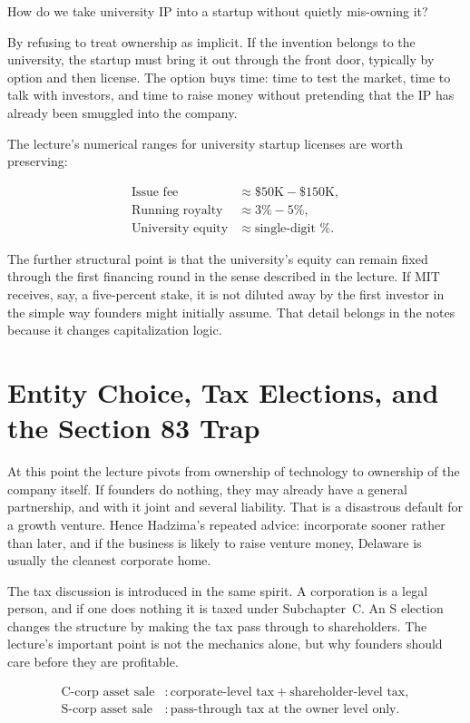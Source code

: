How do we take university IP into a startup without quietly mis-owning it?

By refusing to treat ownership as implicit. If the invention belongs to the university, the startup must bring it out through the front door, typically by option and then license. The option buys time: time to test the market, time to talk with investors, and time to raise money without pretending that the IP has already been smuggled into the company.

The lecture's numerical ranges for university startup licenses are worth preserving:

\begin{align}
\text{Issue fee} &\approx \$50\text{K}-\$150\text{K},\\
\text{Running royalty} &\approx 3\%-5\%,\\
\text{University equity} &\approx \text{single-digit }\%.
\end{align}

The further structural point is that the university's equity can remain fixed through the first financing round in the sense described in the lecture. If MIT receives, say, a five-percent stake, it is not diluted away by the first investor in the simple way founders might initially assume. That detail belongs in the notes because it changes capitalization logic.

\section{Entity Choice, Tax Elections, and the Section 83 Trap}

At this point the lecture pivots from ownership of technology to ownership of the company itself. If founders do nothing, they may already have a general partnership, and with it joint and several liability. That is a disastrous default for a growth venture. Hence Hadzima's repeated advice: incorporate sooner rather than later, and if the business is likely to raise venture money, Delaware is usually the cleanest corporate home.

The tax discussion is introduced in the same spirit. A corporation is a legal person, and if one does nothing it is taxed under Subchapter~C. An S election changes the structure by making the tax pass through to shareholders. The lecture's important point is not the mechanics alone, but why founders should care before they are profitable.

\begin{align}
\text{C-corp asset sale} &: \text{corporate-level tax} + \text{shareholder-level tax},\\
\text{S-corp asset sale} &: \text{pass-through tax at the owner level only}.
\end{align}

